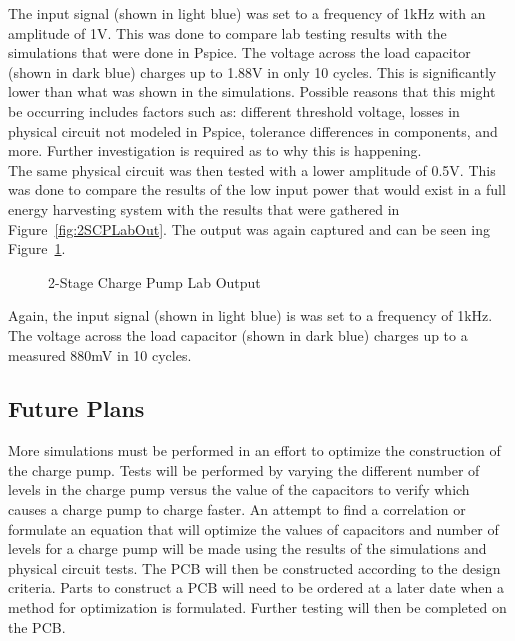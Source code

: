 \documentclass[12pt]{article}
\begin{document}
\noindent The input signal (shown in light blue) was set to a frequency of 1kHz with an amplitude of 1V. This was done to compare lab testing results with the simulations that were done in Pspice. The voltage across the load capacitor (shown in dark blue) charges up to 1.88V in only 10 cycles. This is significantly lower than what was shown in the simulations. Possible reasons that this might be occurring includes factors such as: different threshold voltage, losses in physical circuit not modeled in Pspice, tolerance differences in components, and more. Further investigation is required as to why this is happening.\\

\noindent The same physical circuit was then tested with a lower amplitude of 0.5V. This was done to compare the results of the low input power that would exist in a full energy harvesting system with the results that were gathered in Figure~\ref{fig:2SCPLabOut}. The output was again captured and can be seen ing Figure~\ref{fig:2SCPLabOut2}.

\begin{figure}[H]
\caption{2-Stage Charge Pump Lab Output}
\label{fig:2SCPLabOut2}
\end{figure}

Again, the input signal (shown in light blue) is was set to a frequency of 1kHz. The voltage across the load capacitor (shown in dark blue) charges up to a measured 880mV in 10 cycles.

	\subsection{Future Plans}
More simulations must be performed in an effort to optimize the construction of the charge pump. Tests will be performed by varying the different number of levels in the charge pump versus the value of the capacitors to verify which causes a charge pump to charge faster. An attempt to find a correlation or formulate an equation that will optimize the values of capacitors and number of levels for a charge pump will be made using the results of the simulations and physical circuit tests. The PCB will then be constructed according to the design criteria. Parts to construct a PCB will need to be ordered at a later date when a method for optimization is formulated. Further testing will then be completed on the PCB.
	
\end{document}
